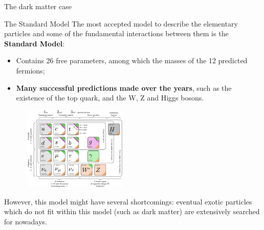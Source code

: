 \documentclass[8pt]{beamer}
\begin{document}
\begin{frame}[standout]
The dark matter case
\end{frame}

\begin{frame}{The Standard Model}
\justifying
The most accepted model to describe the elementary particles and some of the fundamental interactions between them is the \textbf{Standard Model}:

\begin{itemize}
\justifying
\item Contains 26 free parameters, among which the masses of the 12 predicted fermions;
\item \textbf{Many successful predictions made over the years}, such as the existence of the top quark, and the W, Z and Higgs bosons.
\end{itemize} \vfill

\begin{figure}[htbp]
\begin{center}
\includegraphics[width=5.2cm, height=4cm]{figs/SMFermions.png}
\end{center}
\end{figure} \vfill

However, \alert{this model might have several shortcomings}: eventual exotic particles which do not fit within this model (such as dark matter) are extensively searched for nowadays. \vfill
\end{frame}
\end{document}
